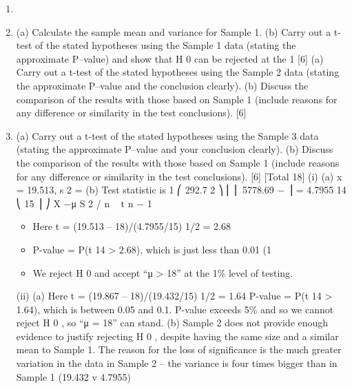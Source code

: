 \documentclass[a4paper,12pt]{article}
\begin{document}
\begin{enumerate}
11
Consider the following three independent random samples from a normally
distributed population with unknown mean μ:
Sample 1:
19.9 20.4 20.3 22.3 16.7 18.7 20.5 19.0 20.1 16.4 21.5 21.4 17.8 22.5 15.2
For these data: n = 15,
∑ x i = 292.7,
∑ x i 2 = 5, 778.69
Sample 2:
20.8 25.9 22.1 21.7 16.0 12.1 27.6 16.1 16.8 17.1 21.3 18.6 24.9 14.8 22.2
For these data: n = 15,
∑ x i = 298.0,
sample mean = 19.867,
∑ x i 2 = 6,192.32
sample variance = 19.432
Sample 3:
20.6 18.5 21.5 16.9 21.5 21.2 20.9 22.4 14.5 22.0 20.2 17.0 20.3 23.0 19.3
18.9 20.6 20.9 15.3 21.5 16.8 18.5 21.6 16.8 20.4
For these data: n = 25, ∑ x i = 491.1,
sample mean = 19.644,
∑ x i 2 = 9, 773.77
sample variance = 5.275
Consider t-tests of the hypotheses H 0 : μ = 18 v H 1 : μ > 18.
\item 
\item 
(a) Calculate the sample mean and variance for Sample 1.
(b) Carry out a t-test of the stated hypotheses using the Sample 1 data (stating the approximate P–value) and show that H 0 can be rejected at the 1%
[6]
(a) Carry out a t-test of the stated hypotheses using the Sample 2 data (stating the approximate P–value and the conclusion clearly).
(b) Discuss the comparison of the results with those based on Sample 1
(include reasons for any difference or similarity in the test
conclusions).
[6]
\item 
(a) Carry out a t-test of the stated hypotheses using the Sample 3 data (stating the approximate P–value and your conclusion clearly).
(b) Discuss the comparison of the results with those based on Sample 1
(include reasons for any difference or similarity in the test
conclusions).
[6]
[Total 18]
\newpage
{}
(i)
(a) x = 19.513, s 2 =
(b) Test statistic is
1 ⎛
292.7 2 ⎞
⎜ ⎜ 5778.69 −
⎟ = 4.7955
14 ⎝
15 ⎟ ⎠
X −μ
S 2 / n
~ t n − 1
\begin{itemize}
\item Here t = (19.513 – 18)/(4.7955/15) 1/2 = 2.68
\item P-value = P(t 14 > 2.68), which is just less than 0.01 (1%
\item We reject H 0 and accept “μ > 18” at the 1\% level of testing.
\end{itemize}
(ii)
(a)
Here t = (19.867 – 18)/(19.432/15) 1/2 = 1.64
P-value = P(t 14 > 1.64), which is between 0.05 and 0.1.
P-value exceeds 5\% and so we cannot reject H 0 , so “μ = 18” can stand.
(b)
Sample 2 does not provide enough evidence to justify rejecting H 0 ,
despite having the same size and a similar mean to Sample 1.
The reason for the loss of significance is the much greater variation in the data in Sample 2 – the variance is four times bigger than in Sample 1 (19.432 v 4.7955)


\end{enumerate}
\end{document}
